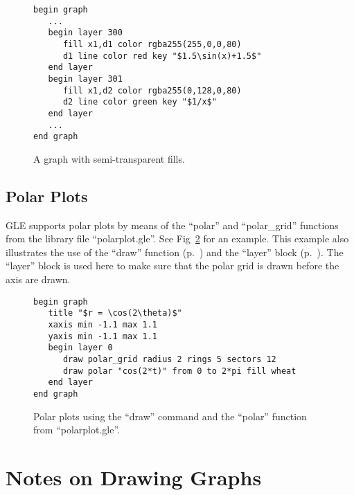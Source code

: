 \begin{figure}[tb]
\begin{minipage}[c]{7.5cm}
\begin{Verbatim}
begin graph
   ...
   begin layer 300
      fill x1,d1 color rgba255(255,0,0,80)
      d1 line color red key "$1.5\sin(x)+1.5$"
   end layer
   begin layer 301
      fill x1,d2 color rgba255(0,128,0,80)
      d2 line color green key "$1/x$"
   end layer
   ...
end graph
\end{Verbatim}
\end{minipage}
\hfill
\begin{minipage}[c]{7cm}
\hascairo{
\mbox{}
}
\end{minipage}
\caption{\label{fig:semitrans}A graph with semi-transparent fills.}
\end{figure}

\subsection{Polar Plots}
\label{sec:polar}

GLE supports polar plots by means of the ``polar'' and ``polar\_grid'' functions from the library file ``polarplot.gle''. See Fig~\ref{fig:polar} for an example. This example also illustrates the use of the ``draw'' function (p.~\pageref{cmd:draw}) and the ``layer'' block (p.~\pageref{cmd:layer}). The ``layer'' block is used here to make sure that the polar grid is drawn before the axis are drawn.

\begin{figure}[tb]
\begin{minipage}[c]{10.5cm}
\begin{Verbatim}
begin graph
   title "$r = \cos(2\theta)$"
   xaxis min -1.1 max 1.1
   yaxis min -1.1 max 1.1
   begin layer 0
      draw polar_grid radius 2 rings 5 sectors 12
      draw polar "cos(2*t)" from 0 to 2*pi fill wheat
   end layer
end graph
\end{Verbatim}
\end{minipage}
\hfill
\begin{minipage}[c]{5cm}
\mbox{}
\end{minipage}
\caption{\label{fig:polar}Polar plots using the ``draw'' command and the ``polar'' function from ``polarplot.gle''.}
\end{figure}

\section{Notes on Drawing Graphs}

